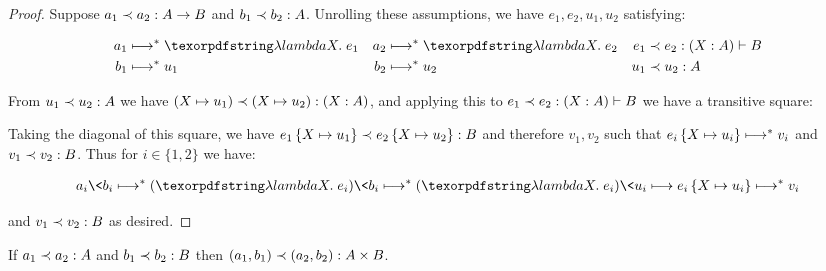\begin{proof}
  Suppose $\oplrclosed{A \to B}{a_1}{a_2}$ and $\oplrclosed A {b_1}{b_2}$.
%
%
  Unrolling these assumptions, we have $e_1,e_2,u_1,u_2$ satisfying:

  \begin{align*}
    a_1 &\evalsto \efn x e_1
    &
    a_2 &\evalsto \efn x e_2
    &
    e_1 &\prec e_2 : (\hm x A) \vdash B
    \\
    b_1 &\evalsto u_1
    &
    b_2 &\evalsto u_2
    &
    u_1 &\prec u_2 : A
  \end{align*}

  \noindent
%
  From $\oplrvalue A {u_1}{u_2}$ we have $\oplr{(\hm x A)}{(\subto{\mvar x}{u_1})}{(\subto{\mvar x}{u_2})}$, and applying this to $\oplr{(\hm x A) \vdash B}{e_1}{e_2}$ we have a transitive square:

  \begin{center}
            {}
  \end{center}

  \noindent
  Taking the diagonal of this square, we have $\oplrclosed B {\subone{e_1}{\mvar x}{u_1}} {\subone{e_2}{\mvar x}{u_2}}$ and therefore $v_1,v_2$ such that $\subone{e_i}{\mvar x}{u_i} \evalsto v_i$ and $\oplrvalue B {v_1} {v_2}$.
%
  Thus for $i \in \{1,2\}$ we have:

  \begin{align*}
    a_i\<b_i
    \evalsto (\efn x e_i)\<b_i
    \evalsto (\efn x e_i)\<u_i
    \stepsto \subone{e_i}{\mvar x}{u_i}
    \evalsto v_i
  \end{align*}

  \noindent
  and $\oplrvalue B {v_1}{v_2}$ as desired.
\end{proof}

\begin{lemma}
  If $\oplrclosed A {a_1} {a_2}$ and $\oplrclosed B {b_1} {b_2}$ then $\oplrclosed{A \times B}{\etuple{a_1,b_1}}{\etuple{a_2,b_2}}$.
\end{lemma}

